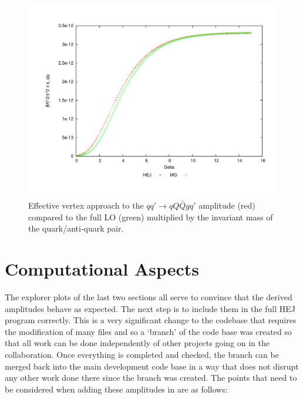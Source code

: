 \begin{figure}[H]
\centering
\includegraphics[scale=0.44]{Images/qQ_qqqxgQ_sqq.pdf}
\caption{Effective vertex approach to the $qq' \to qQ\bar{Q}gq'$ amplitude (red) compared to the full LO (green) multiplied by the invariant mass of the quark/anti-quark pair.}
\label{fig:central_gback}
\end{figure}

\section{Computational Aspects}
The explorer plots of the last two sections all serve to convince that the derived amplitudes behave as expected. The next step is to include them in the full HEJ program correctly. This is a very significant change to the codebase that requires the modification of many files and so a `branch' of the code base was created so that all work can be done independently of other projects going on in the collaboration. Once everything is completed and checked, the branch can be merged back into the main development code base in a way that does not disrupt any other work done there since the branch was created. The points that need to be considered when adding these amplitudes in are as follows:

